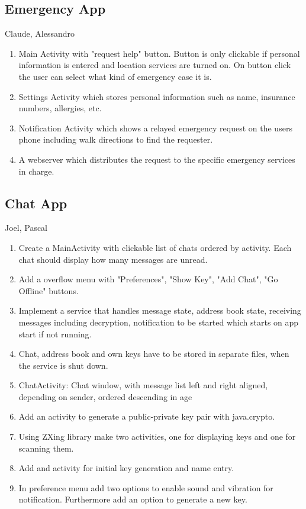 		
		\subsection{Emergency App}
			Claude, Alessandro
			\begin{enumerate}
				\item Main Activity with "request help" button. Button is only clickable if personal information is entered and location services are turned on. On button click the user can select what kind of emergency case it is.
				\item Settings Activity which stores personal information such as name, insurance numbers, allergies, etc.
				\item Notification Activity which shows a relayed emergency request on the users phone including walk directions to find the requester.
				\item A webserver which distributes the request to the specific emergency services in charge.
			\end{enumerate}
		
\subsection{Chat App}
	Joel, Pascal
	\begin{enumerate}
		\item Create a MainActivity with clickable list of chats ordered by activity. Each chat should display how many messages are unread.
		\item Add a overflow menu with "Preferences", "Show Key", "Add Chat", "Go Offline" buttons.
		\item Implement a service that handles message state, address book state, receiving messages including decryption, notification to be started which starts on app start if not running.
		\item Chat, address book and own keys have to be stored in separate files, when the service is shut down.
		\item ChatActivity: Chat window, with message list left and right aligned, depending on sender, ordered descending in age
		\item Add an activity to generate a public-private key pair with java.crypto.
		\item Using ZXing library make two activities, one for displaying keys and one for scanning them.
		\item Add and activity for initial key generation and name entry.
		\item In preference menu add two options to enable sound and vibration for notification. Furthermore add an option to generate a new key.
	\end{enumerate}
			